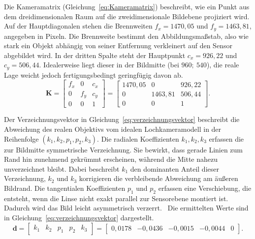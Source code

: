 Die Kameramatrix (Gleichung~\ref{eq:Kameramatrix}) beschreibt, wie ein Punkt aus dem dreidimensionalen Raum auf die zweidimensionale Bildebene projiziert wird.
Auf der Hauptdiagonalen stehen die Brennweiten $f_x = 1470{,}05$ und $f_y = 1463{,}81$, angegeben in Pixeln.
Die Brennweite bestimmt den Abbildungsmaßstab, also wie stark ein Objekt abhängig von seiner Entfernung verkleinert auf den Sensor abgebildet wird.
In der dritten Spalte steht der Hauptpunkt  $c_x = 926{,}22$ und $c_y = 506{,}44$.
Idealerweise liegt dieser in der Bildmitte (bei $960;\ 540$), die reale Lage weicht jedoch fertigungsbedingt geringfügig davon ab.~\cite{Bradski2008}
\begin{equation}
\label{eq:Kameramatrix}
\mathbf{K} =
\begin{bmatrix}
        f_x & 0   & c_x \\
0   & f_y & c_y \\
0   & 0   & 1
\end{bmatrix}
    =
\begin{bmatrix}
1470{,}05 & 0         & 926{,}22 \\
0         & 1463{,}81 & 506{,}44 \\
0         & 0         & 1
\end{bmatrix}.
\end{equation}



Der Verzeichnungsvektor in Gleichung~\ref{eq:verzeichnungsvektor} beschreibt die Abweichung des realen Objektivs vom idealen Lochkameramodell in der Reihenfolge $(k_1, k_2, p_1, p_2, k_3)$.
Die radialen Koeffizienten $k_1, k_2, k_3$ erfassen die zur Bildmitte symmetrische Verzeichnung.
Sie bewirkt, dass gerade Linien zum Rand hin zunehmend gekrümmt erscheinen, während die Mitte nahezu unverzeichnet bleibt.
Dabei beschreibt $k_1$ den dominanten Anteil dieser Verzeichnung, $k_2$ und $k_3$ korrigieren die verbleibende Abweichung am äußeren Bildrand.
Die tangentialen Koeffizienten $p_1$ und $p_2$ erfassen eine Verschiebung, die entsteht, wenn die Linse nicht exakt parallel zur Sensorebene montiert ist.
Dadurch wird das Bild leicht asymmetrisch verzerrt.~\cite{Bradski2008}
Die ermittelten Werte sind in Gleichung~\ref{eq:verzeichnungsvektor} dargestellt.
\begin{equation}
\label{eq:verzeichnungsvektor}
    \mathbf{d} =
    \begin{bmatrix} k_1 & k_2 & p_1 & p_2 & k_3 \end{bmatrix}
    =
    \begin{bmatrix} 0{,}0178 & -0{,}0436 & -0{,}0015 & -0{,}0044 & 0 \end{bmatrix}.
\end{equation}



